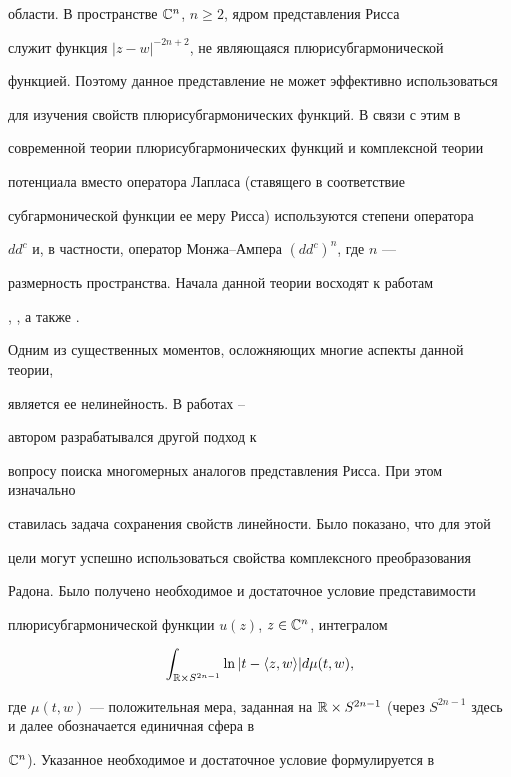 области. В пространстве $\Bbb C^n$, $n\ge 2$, ядром представления Рисса 


служит функция $|z-w|^{-2n+2}$, не являющаяся плюрисубгармонической 


функцией. Поэтому данное представление не может эффективно использоваться 


для изучения свойств плюрисубгармонических функций. В связи с этим в 


современной теории плюрисубгармонических функций и комплексной теории 


потенциала вместо оператора Лапласа (ставящего в соответствие 


субгармонической функции ее меру Рисса) используются степени оператора 


$dd^c$ и, в частности, оператор Монжа--Ампера $(dd^c)^n$, где $n$ --- 


размерность пространства. Начала данной теории восходят к работам 


\cite{BT1}, \cite{BT2}, а также \cite{Sadul1}. 


Одним из существенных моментов, осложняющих многие аспекты данной теории, 


является ее нелинейность. В работах \cite{Seker1}--\cite{Seker7}


автором разрабатывался другой подход к 


вопросу поиска многомерных аналогов представления Рисса. При этом изначально 


ставилась задача сохранения свойств линейности. Было показано, что для этой 


цели могут успешно использоваться свойства комплексного преобразования 


Радона. Было получено необходимое и достаточное условие представимости 


плюрисубгармонической функции $u(z)$, $z\in \Bbb C^n$, интегралом 


\begin{equation}\label{form2}


\int_{\Bbb R\times S^{2n-1}}\ln|t-\langle z,w\rangle |d\mu(t, w),


\end{equation}


где $\mu(t, w)$ --- положительная мера, заданная на $\Bbb R\times 


S^{2n-1}$ (через $S^{2n-1}$ здесь и далее обозначается единичная сфера в 


$\Bbb C^n$). Указанное необходимое и достаточное условие формулируется в 


